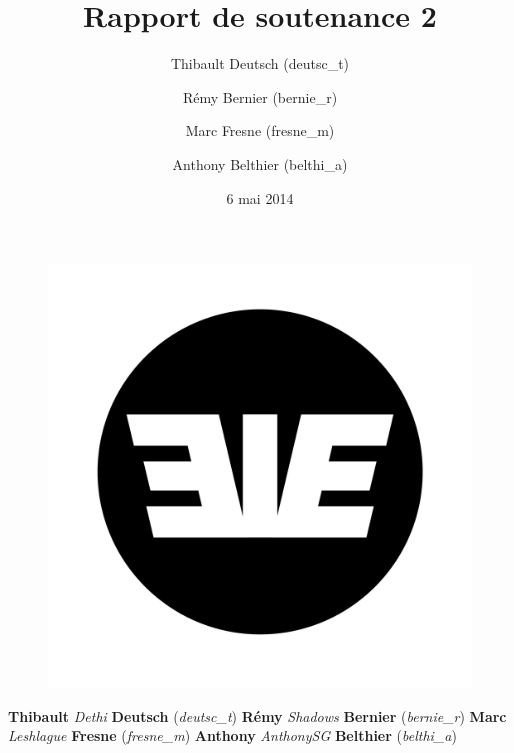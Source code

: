 \documentclass[11pt]{report}
\title{Rapport de soutenance 2}
\author{Thibault Deutsch (deutsc\_t) \and Rémy Bernier (bernie\_r) \and Marc Fresne (fresne\_m) \and Anthony Belthier (belthi\_a)}
\date{6 mai 2014}
\begin{document}

\thispagestyle{empty}
\begin{center}
{}
\par
\vspace*{0.5cm}
{}
\par
{\fontsize{15}{18}{{\textbf{\today}}}}
\end{center}

\vspace*{0.5cm}
\begin{figure}[htbp]
   \begin{center}
      \includegraphics[scale = 0.05]{eie.png}
   \end{center}
\end{figure}

\vspace*{0.5cm}
\par
\begin{center}
\fontsize{16}{20}
\textbf{Thibault }
\emph{Dethi }
\textbf{Deutsch}
(\emph{deutsc\_t})
\newline
\textbf{Rémy }
\emph{Shadows }
\textbf{Bernier}
(\emph{bernie\_r})
\newline
\textbf{Marc }
\emph{Leshlague }
\textbf{Fresne}
(\emph{fresne\_m})
\newline
\textbf{Anthony }
\emph{AnthonySG }
\textbf{Belthier}
(\emph{belthi\_a})
\newline
\end{center}
\end{document}
